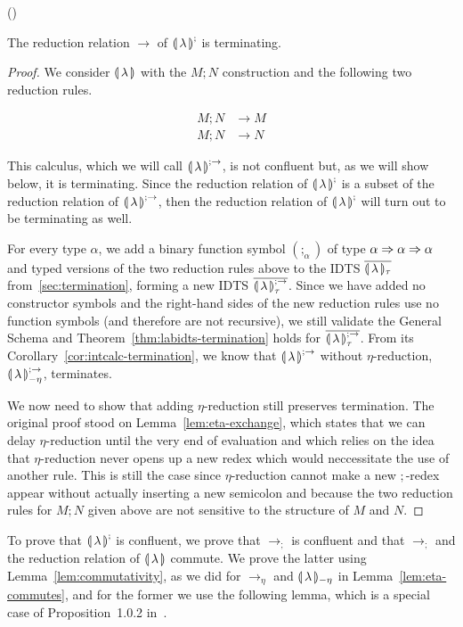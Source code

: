 \begin{lemma}\label{lem:semibanana-termination}
  ()

  The reduction relation $\to$ of ${\llparenthesis \, \lambda \, \rrparenthesis}^;$ is terminating.
\end{lemma}

\begin{proof}
  We consider ${\llparenthesis \, \lambda \, \rrparenthesis}$ with the $M; N$ construction and the following two
  reduction rules.

  \begin{align*}
    M; N &\to M \\
    M; N &\to N
  \end{align*}

  This calculus, which we will call ${\llparenthesis \, \lambda \, \rrparenthesis}^{;\to}$, is not confluent but,
  as we will show below, it is terminating. Since the reduction relation of
  ${\llparenthesis \, \lambda \, \rrparenthesis}^;$ is a subset of the reduction relation of ${\llparenthesis \, \lambda \, \rrparenthesis}^{;\to}$, then
  the reduction relation of ${\llparenthesis \, \lambda \, \rrparenthesis}^;$ will turn out to be terminating as
  well.

  For every type $\alpha$, we add a binary function symbol $(;_\alpha)$ of
  type $\alpha \Rightarrow \alpha \Rightarrow \alpha$ and typed versions of the two
  reduction rules above to the IDTS ${\overline{\llparenthesis \, \lambda \, \rrparenthesis_\tau}}$ from~\ref{sec:termination},
  forming a new IDTS $\overline{{\llparenthesis \, \lambda \, \rrparenthesis}^{;\to}_\tau}$. Since we have added no
  constructor symbols and the right-hand sides of the new reduction rules
  use no function symbols (and therefore are not recursive), we still
  validate the General Schema and Theorem~\ref{thm:labidts-termination}
  holds for $\overline{{\llparenthesis \, \lambda \, \rrparenthesis}^{;\to}_\tau}$. From its
  Corollary~\ref{cor:intcalc-termination}, we know that ${\llparenthesis \, \lambda \, \rrparenthesis}^{;\to}$
  without $\eta$-reduction, ${\llparenthesis \, \lambda \, \rrparenthesis}^{;\to}_{-\eta}$, terminates.

  We now need to show that adding $\eta$-reduction still preserves
  termination. The original proof stood on Lemma~\ref{lem:eta-exchange},
  which states that we can delay $\eta$-reduction until the very end of
  evaluation and which relies on the idea that $\eta$-reduction never opens
  up a new redex which would neccessitate the use of another rule. This is
  still the case since $\eta$-reduction cannot make a new $;$-redex appear
  without actually inserting a new semicolon and because the two reduction
  rules for $M; N$ given above are not sensitive to the structure of $M$
  and $N$.
\end{proof}

To prove that ${\llparenthesis \, \lambda \, \rrparenthesis}^;$ is confluent, we prove that $\to_;$ is confluent
and that $\to_;$ and the reduction relation of ${\llparenthesis \, \lambda \, \rrparenthesis}$ commute. We prove
the latter using Lemma~\ref{lem:commutativity}, as we did for $\to_\eta$
and ${\llparenthesis \, \lambda \, \rrparenthesis_{-\eta}}$ in Lemma~\ref{lem:eta-commutes}, and for the former we use
the following lemma, which is a special case of Proposition~1.0.2
in~\cite{klop1992term}.

